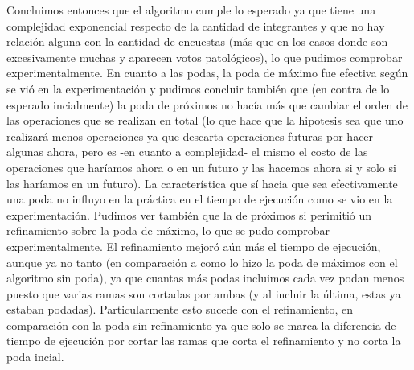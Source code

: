 \documentclass[A4paper,oneside,fleqn,10pt]{article}
\theoremstyle{definition}
\begin{document}
Concluimos entonces que el algoritmo cumple lo esperado ya que tiene una complejidad exponencial respecto de la cantidad de integrantes y que no hay relación alguna con la cantidad de encuestas (más que en los casos donde son excesivamente muchas y aparecen votos patológicos), lo que pudimos comprobar experimentalmente. En cuanto a las podas, la poda de máximo fue efectiva según se vió en la experimentación y pudimos concluir también que  (en contra de lo esperado incialmente) la poda de próximos no hacía más que cambiar el orden de las operaciones que se realizan en total (lo que hace que la hipotesis sea que uno realizará menos operaciones ya que descarta operaciones futuras por hacer algunas ahora, pero es -en cuanto a complejidad- el mismo el costo de las operaciones que haríamos ahora o en un futuro y las hacemos ahora si y solo si las haríamos en un futuro). La característica que sí hacia que sea efectivamente una poda no influyo en la práctica en el tiempo de ejecución como se vio en la experimentación. Pudimos ver también que la de próximos si perimitió un refinamiento sobre la poda de máximo, lo que se pudo comprobar experimentalmente. El refinamiento mejoró aún más el tiempo de ejecución, aunque ya no tanto (en comparación a como lo hizo la poda de máximos con el algoritmo sin poda), ya que cuantas más podas incluimos cada vez podan menos puesto que varias ramas son cortadas por ambas (y al incluir la última, estas ya estaban podadas). Particularmente esto sucede con el refinamiento, en comparación con la poda sin refinamiento ya que solo se marca la diferencia de tiempo de ejecución por cortar las ramas que corta el refinamiento y no corta la poda incial.
\end{document}
